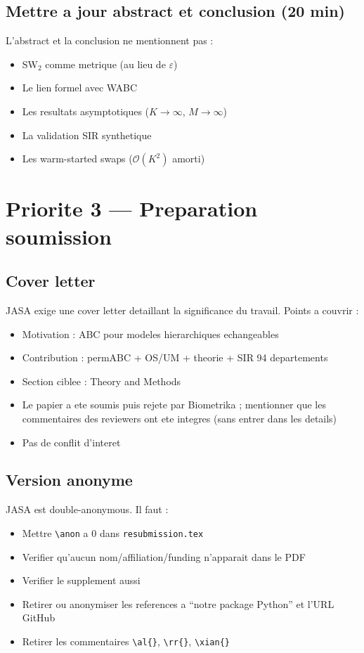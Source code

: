 \documentclass[11pt]{article}
\begin{document}
\subsection{Mettre a jour abstract et conclusion (20 min)}

L'abstract et la conclusion ne mentionnent pas :
\begin{itemize}[nosep]
    \item SW$_2$ comme metrique (au lieu de $\varepsilon$)
    \item Le lien formel avec WABC
    \item Les resultats asymptotiques ($K\to\infty$, $M\to\infty$)
    \item La validation SIR synthetique
    \item Les warm-started swaps ($\mathcal{O}(K^2)$ amorti)
\end{itemize}

\section{Priorite 3 --- Preparation soumission}

\subsection{Cover letter}

JASA exige une cover letter detaillant la significance du travail. Points a couvrir :
\begin{itemize}[nosep]
    \item Motivation : ABC pour modeles hierarchiques echangeables
    \item Contribution : permABC + OS/UM + theorie + SIR 94 departements
    \item Section ciblee : Theory and Methods
    \item Le papier a ete soumis puis rejete par Biometrika ; mentionner que les commentaires des reviewers ont ete integres (sans entrer dans les details)
    \item Pas de conflit d'interet
\end{itemize}

\subsection{Version anonyme}

JASA est double-anonymous. Il faut :
\begin{itemize}[nosep]
    \item Mettre \verb|\anon| a 0 dans \texttt{resubmission.tex}
    \item Verifier qu'aucun nom/affiliation/funding n'apparait dans le PDF
    \item Verifier le supplement aussi
    \item Retirer ou anonymiser les references a ``notre package Python'' et l'URL GitHub
    \item Retirer les commentaires \verb|\al{}|, \verb|\rr{}|, \verb|\xian{}|
\end{itemize}
\end{document}
